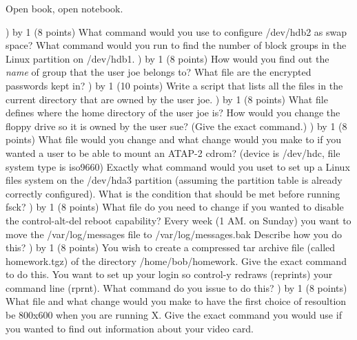 
\parindent=0in
\nopagenumbers
\newcount\quesno
{}
\def\ques{\number\quesno) \advance\quesno by 1}
\def\aspace{\vskip 1.5in}

Open book, open notebook.

\ques
(8 points)
What command would you use to configure {\ltt{}/dev/hdb2} as swap space?
\vskip 0.8in
What command would you run to find the number of block groups
in the Linux partition on {\ltt{}/dev/hdb1}.
\vskip 0.8in
\ques
(8 points)
How would you find out the {\it name} of group that the user 
{\ltt{}joe} belongs to?
\vskip 1.5in
What file are the encrypted passwords kept in?
\vskip 0.5in
\ques
(10 points)
Write a script that lists all the files in the current directory
that are owned by the user {\ltt{}joe}.
\vfill\eject
\ques
(8 points)
What file defines where the home directory of the user {\ltt{}joe} is?
\vskip 0.8in
How would you change the floppy drive so it is owned by the 
user {\ltt{}sue}?
(Give the exact command.)
\vskip 0.8in
\ques
(8 points)
What file would you change and what change would you make to
if you wanted a user to be able to mount an ATAP-2 cdrom?
(device is {\ltt{}/dev/hdc}, file system type is {\ltt{}iso9660})
\vskip 0.8in
Exactly what command would you uset to set up a Linux files system on the
{\ltt{}/dev/hda3} partition (assuming the partition table is already
correctly configured).
\vskip 0.8in
What is the condition that should be met before running {\ltt{}fsck}?
\vskip 0.8in
\ques
(8 points)
What file do you need to change if you wanted to disable the
control-alt-del reboot capability?
\vskip 0.5in
Every week (1 AM. on Sunday) you want to move the {\ltt{}/var/log/messages}
file to {\ltt{}/var/log/messages.bak}
Describe how you do this?
\vfill\eject
\ques
(8 points)
You wish to create a compressed tar archive file 
(called {\ltt{}homework.tgz})
of the directory {\ltt{}/home/bob/homework}.
Give the exact command to do this.
\vskip 0.5in
You want to set up your login so control-y redraws (reprints)
your command line ({\ltt{}rprnt}).
What command do you issue to do this?
\vskip 0.5in
\ques
(8 points)
What file and what change would you make to have the first choice
of resoultion be 800x600 when you are running X.
\vskip 0.8in
Give the exact command you would use if you wanted to find out 
information about your video card.
\vskip 0.5in
